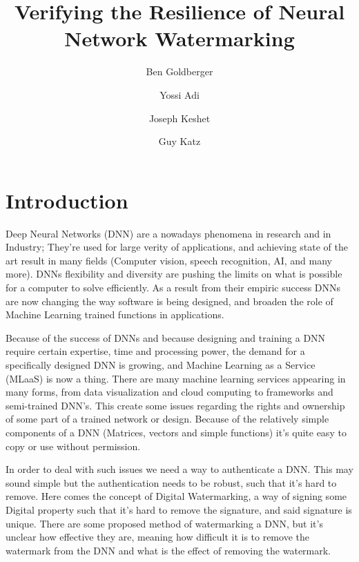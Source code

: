 \documentclass[a4paper]{easychair}
\begin{document}
\title{Verifying the Resilience of Neural Network Watermarking}

\author{
  Ben Goldberger \and
  Yossi Adi \and
  Joseph Keshet \and
  Guy Katz 
}


\maketitle

\section{Introduction}


Deep Neural Networks (DNN) are a nowadays phenomena in research and in Industry; They're used for large verity of applications, and achieving state of the art result in many fields (Computer vision, speech recognition, AI, and many more). DNNs flexibility and diversity are pushing the limits on what is possible for a computer to solve efficiently. As a result from their empiric success DNNs are now changing the way software is being designed, and broaden the role of Machine Learning trained functions in applications.

Because of the success of DNNs and because designing and training a DNN require certain expertise, time and processing power, the demand for a specifically designed DNN is growing, and Machine Learning as a Service (MLaaS) is now a thing. There are many machine learning services appearing in many forms, from data visualization and cloud computing to frameworks and semi-trained DNN's. This create some issues regarding the rights and ownership of some part of a trained network or design. Because of the relatively simple components of a DNN (Matrices, vectors and simple functions) it's quite easy to copy or use without permission.

In order to deal with such issues we need a way to authenticate a DNN. This may sound simple but the authentication needs to be robust, such that it's hard to remove. Here comes the concept of Digital Watermarking, a way of signing some Digital property such that it's hard to remove the signature, and said signature is unique. There are some proposed method of watermarking a DNN, but it's unclear how effective they are, meaning how difficult it is to remove the watermark from the DNN and what is the effect of removing the watermark.
\end{document}

